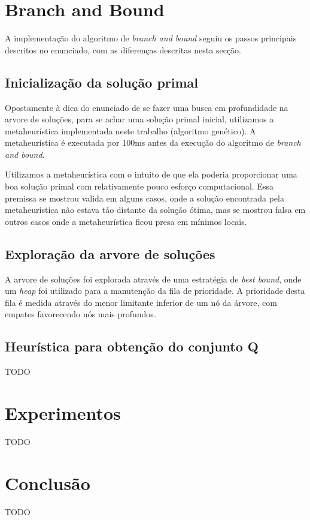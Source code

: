 \documentclass[a4paper,11pt,twoside]{article}
\begin{document}
\section{Branch and Bound}
A implementação do algoritmo de \textit{branch and bound} seguiu os passos principais
descritos no enunciado, com as diferenças descritas nesta secção.

\subsection{Inicialização da solução primal}
Opostamente à dica do enunciado de se fazer uma busca em profundidade na arvore
de soluções, para se achar uma solução primal inicial, utilizamos a metaheurística
implementada neste trabalho (algoritmo genético). A metaheurística é executada
por 100ms antes da execução do algoritmo de \textit{branch and bound}.

Utilizamos a metaheurística com o intuito de que ela poderia proporcionar uma
boa solução primal com relativamente pouco esforço computacional. Essa premissa
se mostrou valida em alguns casos, onde a solução encontrada pela metaheurística
não estava tão distante da solução ótima, mas se mostrou falsa em outros casos
onde a metaheurística ficou presa em mínimos locais.

\subsection{Exploração da arvore de soluções}
A arvore de soluções foi explorada através de uma estratégia de \textit{best bound},
onde um \textit{heap} foi utilizado para a manutenção da fila de prioridade. A prioridade
desta fila é medida através do menor limitante inferior de um nó da árvore, com empates favorecendo
nós mais profundos.

\subsection{Heurística para obtenção do conjunto Q}
TODO

\section{Experimentos}
TODO

\section{Conclusão}
TODO
\end{document}
